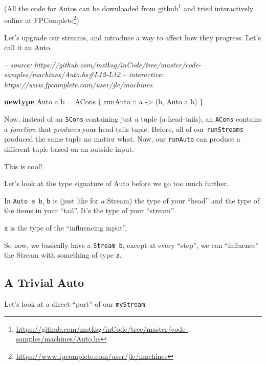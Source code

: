 \documentclass[]{article}
\newenvironment{Shaded}{}{}
\newcommand{\CommentTok}[1]{\textcolor[rgb]{0.38,0.63,0.69}{\textit{#1}}}
\newcommand{\DataTypeTok}[1]{\textcolor[rgb]{0.56,0.13,0.00}{#1}}
\newcommand{\FunctionTok}[1]{\textcolor[rgb]{0.02,0.16,0.49}{#1}}
\newcommand{\KeywordTok}[1]{\textcolor[rgb]{0.00,0.44,0.13}{\textbf{#1}}}
\newcommand{\NormalTok}[1]{#1}
\newcommand{\OtherTok}[1]{\textcolor[rgb]{0.00,0.44,0.13}{#1}}
\renewcommand{\href}[2]{#2\footnote{\url{#1}}}
\begin{document}
(All the code for Autos can be downloaded
\href{https://github.com/mstksg/inCode/tree/master/code-samples/machines/Auto.hs}{from
github} and tried interactively online
\href{https://www.fpcomplete.com/user/jle/machines}{at FPComplete})

Let's upgrade our streams, and introduce a way to affect how they progress.
Let's call it an Auto.

\begin{Shaded}
\begin{Highlighting}[]
\CommentTok{-- source: https://github.com/mstksg/inCode/tree/master/code-samples/machines/Auto.hs#L12-L12}
\CommentTok{-- interactive: https://www.fpcomplete.com/user/jle/machines}

\KeywordTok{newtype} \DataTypeTok{Auto}\NormalTok{ a b }\FunctionTok{=} \DataTypeTok{ACons}\NormalTok{ \{}\OtherTok{ runAuto ::}\NormalTok{ a }\OtherTok{->}\NormalTok{ (b, }\DataTypeTok{Auto}\NormalTok{ a b) \}}
\end{Highlighting}
\end{Shaded}

Now, instead of an \texttt{SCons} containing just a tuple (a head-tails), an
\texttt{ACons} contains a \emph{function} that \emph{produces} your head-tails
tuple. Before, all of our \texttt{runStreams} produced the same tuple no matter
what. Now, our \texttt{runAuto} can produce a different tuple based on an
outside input.

This is cool!

Let's look at the type signature of Auto before we go too much further.

In \texttt{Auto\ a\ b}, \texttt{b} is (just like for a Stream) the type of your
``head'' and the type of the items in your ``tail''. It's the type of your
``stream''.

\texttt{a} is the type of the ``influencing input''.

So now, we basically have a \texttt{Stream\ b}, except at every ``step'', we can
``influence'' the Stream with something of type \texttt{a}.

\hypertarget{a-trivial-auto}{%
\subsection{A Trivial Auto}\label{a-trivial-auto}}

Let's look at a direct ``port'' of our \texttt{myStream}:
\end{document}

